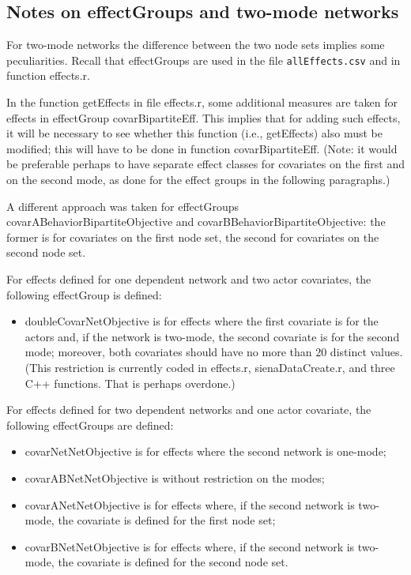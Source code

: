 \documentclass[a4paper,fleqn,11pt]{article}
\newcommand{\+}{\, + \,}
\newcommand{\sfn}[1]{\textsf{#1}}
\begin{document}
\subsection{Notes on effectGroups and two-mode networks}
\label{S_notestwomode}

For two-mode networks the difference between the two node sets implies
some peculiarities.
Recall that effectGroups are used in the file \texttt{allEffects.csv}
and in function \sfn{effects.r}.

In the function \textsf{getEffects} in file \sfn{effects.r}, some additional
measures are taken for effects in effectGroup \sfn{covarBipartiteEff}.
This implies that for adding such effects, it will be necessary to see whether
this function (i.e., \textsf{getEffects}) also must be modified;
this will have to be done in function \sfn{covarBipartiteEff}.
(Note: it would be preferable perhaps to have separate effect classes
for covariates on the first and on the second mode, as done for the effect
groups in the following paragraphs.)

A different approach was taken for effectGroups
\sfn{covarABehaviorBipartiteObjective} and \sfn{covarBBehaviorBipartiteObjective}:
the former is for covariates on the first node set, the second for
covariates on the second node set.

For effects defined for one dependent network and two actor covariates,
the following effectGroup is defined:
\begin{itemize}
\item \sfn{doubleCovarNetObjective} is for effects where the
    first covariate is for the actors and, if the network is two-mode,
    the second covariate is for the second mode;
    moreover, both covariates should have no more than
    20 distinct values. (This restriction is currently
    coded in \sfn{effects.r}, \sfn{sienaDataCreate.r},
    and three C++ functions. That is perhaps overdone.)
\end{itemize}
\medskip

For effects defined for two dependent networks and one actor covariate,
the following effectGroups are defined:
\begin{itemize}
\item \sfn{covarNetNetObjective} is for effects where the second network is one-mode;
\item \sfn{covarABNetNetObjective} is without restriction on the modes;
\item \sfn{covarANetNetObjective}  is for effects where, if the second network is two-mode,
     the covariate is defined for the first node set;
\item \sfn{covarBNetNetObjective} is for effects where, if the second network is two-mode,
     the covariate is defined for the second node set.
\end{itemize}
\medskip
\end{document}
